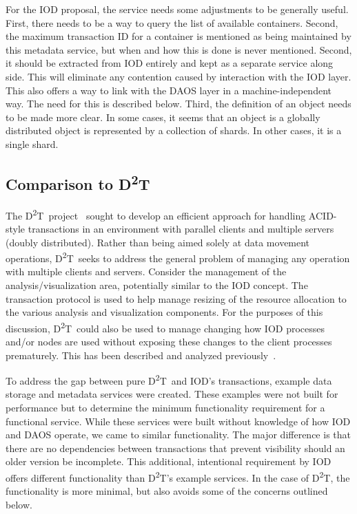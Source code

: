 \documentclass[conference]{sig-alt-gov2}
\newcommand{\DDT}{D\textsuperscript{2}T~}
\newcommand{\DDTns}{D\textsuperscript{2}T}
\begin{document}
For the IOD proposal, the service needs some adjustments to be generally
useful.  First, there needs to be a way to query the list of available
containers. Second, the maximum transaction ID for a container is mentioned as
being maintained by this metadata service, but when and how this is done is
never mentioned. Second, it should be extracted from IOD entirely and kept as
a separate service along side. This will eliminate any contention caused by
interaction with the IOD layer. This also offers a way to link with the DAOS
layer in a machine-independent way. The need for this is described below.
Third, the definition of an object needs to be made more clear. In some cases,
it seems that an object is a globally distributed object is represented by a
collection of shards. In other cases, it is a single shard.

\subsection{Comparison to \DDTns}
The \DDT project~\cite{lofstead:2012:txn} sought to develop an efficient
approach for handling ACID-style transactions in an environment with parallel
clients and multiple servers (doubly distributed). Rather than being aimed
solely at data movement operations, \DDT seeks to address the general problem
of managing any operation with multiple clients and servers.  Consider the
management of the analysis/visualization area, potentially similar to the IOD
concept. The transaction protocol is used to help manage resizing of the
resource allocation to the various analysis and visualization components.  For
the purposes of this discussion, \DDT could also be used to manage changing how
IOD processes and/or nodes are used without exposing these changes to the
client processes prematurely.  This has been described and analyzed
previously~\cite{dayal:2013:io-containers}.

To address the gap between pure \DDT and IOD's transactions, example data
storage and metadata services were created. These examples were not built for
performance but to determine the minimum functionality requirement for a
functional service. While these services were built without knowledge of how
IOD and DAOS operate, we came to similar functionality. The major difference is
that there are no dependencies between transactions that prevent visibility
should an older version be incomplete. This additional, intentional requirement
by IOD offers different functionality than \DDTns's example services. In the
case of \DDTns, the functionality is more minimal, but also avoids some of the
concerns outlined below.
\end{document}
